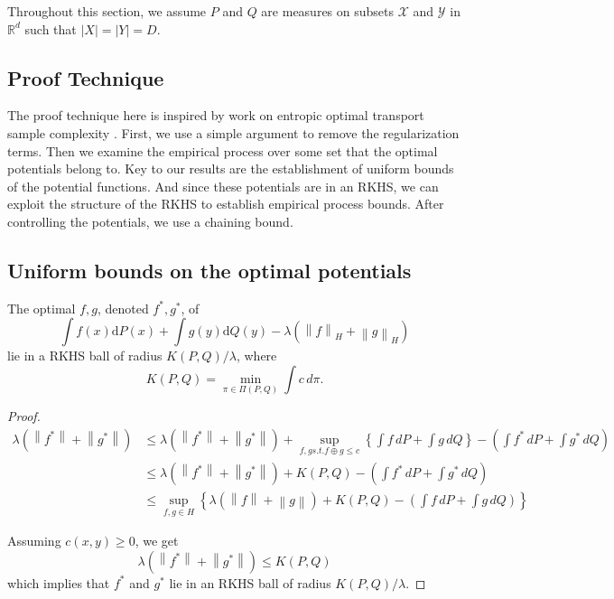 	
	Throughout this section, we assume $P$ and $Q$ are measures on subsets $\mathcal{X}$ and $\mathcal{Y}$ in $\mathbb{R}^d$ such that $\left|X\right|=\left|Y\right|=D$.
	
	\subsection*{Proof Technique}
	 The proof technique here is inspired by work on entropic optimal transport sample complexity \cite{Mena2019}. First, we use a simple argument to remove the regularization terms. Then we examine the empirical process over some set that the optimal potentials belong to. Key to our results are the establishment of uniform bounds of the potential functions. And since these potentials are in an RKHS, we can exploit the structure of the RKHS to establish empirical process bounds. After controlling the potentials, we use a chaining bound.
	
	\subsection*{Uniform bounds on the optimal potentials}
	\begin{prop}
		The optimal $f,g$, denoted $f^*,g^*$, of $$\int f(x)\mathrm{d}P(x)+\int g(y)\mathrm{d}Q(y)-\lambda(\left\|f\right\|_H+\left\|g\right\|_H)$$ lie in a RKHS ball of radius $K(P,Q)/\lambda$, where 
		$$
		K(P,Q)=\min_{\pi\in \Pi(P,Q)} \int c\,d\pi.
		$$
	\end{prop}
	\begin{proof}
		\begin{align*}
			\lambda (\left\|f^*\right\|+\left\|g^*\right\|)&\leq \lambda (\left\|f^*\right\|+\left\|g^*\right\|) + \sup_{f,g s.t. f\oplus g\leq c} \left\{\int f\,dP + \int g\,dQ \right\} - \left(\int f^{*}\,dP + \int g^{*}\,dQ\right) \\
			&\leq \lambda (\left\|f^*\right\|+\left\|g^*\right\|) + K(P,Q) - \left(\int f^{*}\,dP + \int g^{*}\,dQ\right) \\
			&\leq \sup_{f,g\in H} \left\{\lambda (\left\|f\right\|+\left\|g\right\|) + K(P,Q) - \left(\int f\,dP + \int g\,dQ\right)\right\}
		\end{align*}
		
		Assuming $c(x,y)\geq 0$, we get $$\lambda(\left\|f^*\right\|+\left\|g^*\right\|)\leq K(P,Q)$$ which implies that $f^*$ and $g^*$ lie in an RKHS ball of radius $K(P,Q)/\lambda$.
	\end{proof}
	
